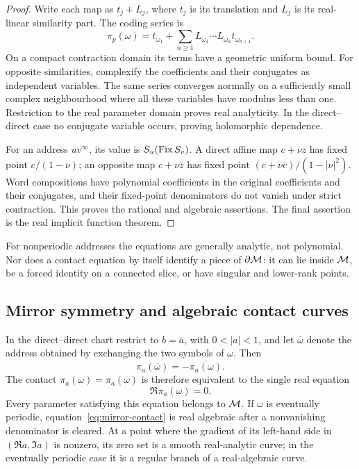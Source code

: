 \begin{proof}
Write each map as $t_j+L_j$, where $t_j$ is its translation and
$L_j$ is its real-linear similarity part. The coding series is
\[
\pi_p(\omega)=t_{\omega_1}
+\sum_{n\ge1}L_{\omega_1}\cdots L_{\omega_n}t_{\omega_{n+1}}.
\]
On a compact contraction domain its terms have a geometric uniform
bound. For opposite similarities, complexify the coefficients and
their conjugates as independent variables. The same series converges
normally on a sufficiently small complex neighbourhood where all
these variables have modulus less than one. Restriction to the real
parameter domain proves real analyticity. In the direct--direct
case no conjugate variable occurs, proving holomorphic dependence.

For an address $uv^\infty$, its value is
$S_u(\operatorname{Fix} S_v)$. A direct affine map $c+\nu z$ has fixed point
$c/(1-\nu)$; an opposite map $c+\nu\overline z$ has fixed point
$(c+\nu\overline c)/(1-|\nu|^2)$. Word compositions have polynomial
coefficients in the original coefficients and their conjugates, and
their fixed-point denominators do not vanish under strict
contraction. This proves the rational and algebraic assertions.
The final assertion is the real implicit function theorem.
\end{proof}

For nonperiodic addresses the equations are generally analytic, not
polynomial. Nor does a contact equation by itself identify a piece
of $\partial\mathcal M$: it can lie inside $\mathcal M$, be a forced identity on
a connected slice, or have singular and lower-rank points.



\subsection{Mirror symmetry and algebraic contact curves}

\begin{proposition}\label{prop:mirror-contact}
In the direct--direct chart restrict to $b=\overline a$, with
$0<|a|<1$, and let $\overline\omega$ denote the address obtained
by exchanging the two symbols of $\omega$. Then
\[
\pi_a(\overline\omega)=-\overline{\pi_a(\omega)}.
\]
The contact $\pi_a(\omega)=\pi_a(\overline\omega)$ is therefore
equivalent to the single real equation
\begin{equation}\label{eq:mirror-contact}
\Re\pi_a(\omega)=0.
\end{equation}
Every parameter satisfying this equation belongs to $\mathcal M$.
If $\omega$ is eventually periodic, equation~\eqref{eq:mirror-contact}
is real algebraic after a nonvanishing denominator is cleared.
At a point where the gradient of its left-hand side in
$(\Re a,\Im a)$ is nonzero, its zero set is a smooth real-analytic
curve; in the eventually periodic case it is a regular branch of
a real-algebraic curve.
\end{proposition}

